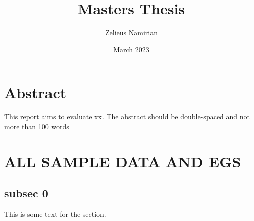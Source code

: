 \documentclass [12pt, a4paper] {article}
\title{Masters Thesis}
\author{Zelieus Namirian}
\date{March 2023}
\begin{document}
\noindent 
\newpage

\tableofcontents
\newpage

\listoftables
\newpage

\listoffigures
\newpage

\printglossary[type=\acronymtype]

\printglossary[type=symbols,style=long,title={List of Symbols}]

\newpage

\section*{Abstract} 
This report aims to evaluate xx. The abstract should be double-spaced and not more than 100 words









\section{ALL SAMPLE DATA AND EGS}
\subsection{subsec 0}
This is some text for the section.
\end{document}

